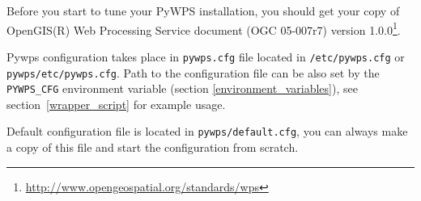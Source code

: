 \documentclass[a4paper,11pt]{report}
\begin{document}
Before you start to tune your PyWPS installation, you should get your copy of
OpenGIS(R) Web Processing Service document (OGC  05-007r7) version
1.0.0\footnote{\url{http://www.opengeospatial.org/standards/wps}}.
    
    
Pywps configuration takes place in \texttt{pywps.cfg} file located in
\texttt{/etc/pywps.cfg} or \texttt{pywps/etc/pywps.cfg}. Path to the
configuration file can be also set by the \texttt{PYWPS\_CFG} environment
variable (section \ref{environment_variables}), see
section~\ref{wrapper_script} for example usage.

Default configuration file is located in \texttt{pywps/default.cfg}, you
can always make a copy of this file and start the configuration from
scratch.
    
\end{document}

